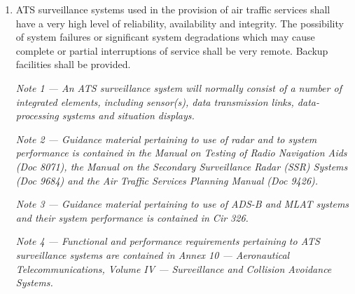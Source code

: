 \documentclass[../main.tex]{subfiles}
\begin{document}
    \begin{enumerate}[label=\arabic{section}.\arabic{subsection}.\arabic*]
        \item ATS surveillance systems used in the provision of air traffic services shall have a very high level of reliability, availability and integrity. The possibility of system failures or significant system degradations which may cause complete or partial interruptions of service shall be very remote. Backup facilities shall be provided.

        \textit{Note 1 --- An ATS surveillance system will normally consist of a number of integrated elements, including sensor(s), data transmission links, data-processing systems and situation displays.}

        \textit{Note 2 --- Guidance material pertaining to use of radar and to system performance is contained in the \emph{Manual on Testing of Radio Navigation Aids} (Doc 8071), the \emph{Manual on the Secondary Surveillance Radar (SSR) Systems} (Doc 9684) and the \emph{Air Traffic Services Planning Manual} (Doc 9426).}

        \textit{Note 3 --- Guidance material pertaining to use of ADS-B and MLAT systems and their system performance is contained in Cir 326.}

        \textit{Note 4 --- Functional and performance requirements pertaining to ATS surveillance systems are contained in \emph{Annex 10} — Aeronautical Telecommunications, \emph{Volume IV} — Surveillance and Collision Avoidance Systems.}


\end{enumerate}
\end{document}
